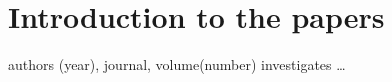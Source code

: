 \chapter{Introduction to the papers}
\label{chap:intropaper}
%
%
{\PIT}
{authors (year), journal, volume(number)}
{{\PI} investigates \ldots}

